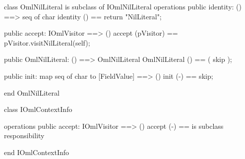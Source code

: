 \begin{vdm_al}
class OmlNilLiteral is subclass of IOmlNilLiteral
operations
  public identity: () ==> seq of char
  identity () == return "NilLiteral";

  public accept: IOmlVisitor ==> ()
  accept (pVisitor) == pVisitor.visitNilLiteral(self);

  public OmlNilLiteral:
      () ==> OmlNilLiteral
  OmlNilLiteral () == 
    ( skip );

  public init: map seq of char to [FieldValue] ==> ()
  init (-) == skip;

end OmlNilLiteral
\end{vdm_al}

\begin{vdm_al}
class IOmlContextInfo

operations
  public accept: IOmlVisitor ==> ()
  accept (-) == is subclass responsibility

end IOmlContextInfo
\end{vdm_al}

